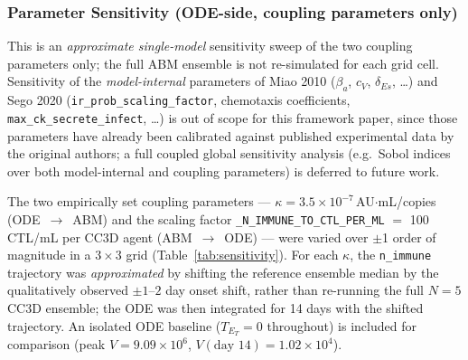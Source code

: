 \documentclass[conference,letterpaper,10pt]{IEEEtran}
\begin{document}
\subsubsection{Parameter Sensitivity (ODE-side, coupling parameters only)}
\label{sec:valid-sens}

This is an \emph{approximate single-model} sensitivity sweep of the two
coupling parameters only; the full ABM ensemble is not re-simulated
for each grid cell. Sensitivity of the \emph{model-internal} parameters
of Miao 2010 ($\beta_a$, $c_V$, $\delta_{Es}$, \dots) and Sego 2020
(\texttt{ir\_prob\_scaling\_factor}, chemotaxis coefficients,
\texttt{max\_ck\_secrete\_infect}, \dots) is out of scope for this
framework paper, since those parameters have already been calibrated
against published experimental data by the original authors; a full
coupled global sensitivity analysis (e.g.\ Sobol indices over both
model-internal and coupling parameters) is deferred to future work.

The two empirically set coupling parameters --- $\kappa =
3.5{\times}10^{-7}$\,AU$\cdot$mL/copies (ODE~$\to$~ABM) and the scaling
factor \texttt{\_N\_IMMUNE\_TO\_CTL\_PER\_ML} $=$ 100\,CTL/mL per CC3D
agent (ABM~$\to$~ODE) --- were varied over $\pm$1 order of magnitude in
a $3{\times}3$ grid (Table~\ref{tab:sensitivity}). For each $\kappa$,
the \texttt{n\_immune} trajectory was \emph{approximated} by shifting
the reference ensemble median by the qualitatively observed
$\pm 1$--$2$ day onset shift, rather than re-running the full
$N\!=\!5$ CC3D ensemble; the ODE was then integrated for 14 days with
the shifted trajectory. An isolated ODE baseline ($T_{E_T}=0$
throughout) is included for comparison (peak
$V\!=\!9.09{\times}10^{6}$, $V(\text{day 14})\!=\!1.02{\times}10^{4}$).
\end{document}
